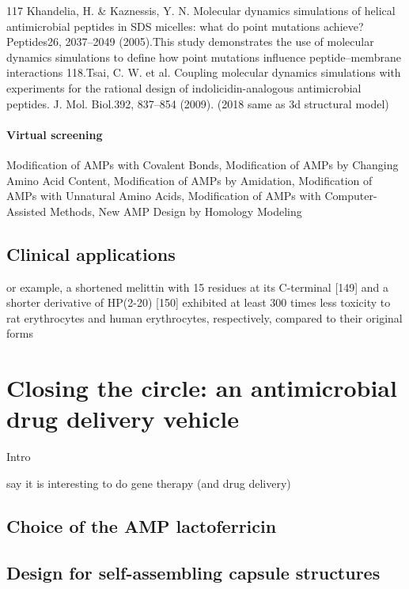 \documentclass[a4paper,11pt]{extreport}
\begin{document}
117 Khandelia, H. & Kaznessis, Y. N. Molecular dynamics simulations of helical antimicrobial peptides in SDS micelles: what do point mutations achieve? Peptides26, 2037–2049 (2005).This study demonstrates the use of molecular dynamics simulations to define how point mutations influence peptide–membrane interactions
118.Tsai, C. W. et al. Coupling molecular dynamics simulations with experiments for the rational design of indolicidin-analogous antimicrobial peptides. J. Mol. Biol.392, 837–854 (2009).
(2018 same as 3d structural model)
\paragraph{Virtual screening}


Modification of AMPs with Covalent Bonds,  Modification of AMPs by Changing Amino Acid Content, Modification of AMPs by Amidation, Modification of AMPs with Unnatural Amino Acids, Modification of AMPs with Computer-Assisted Methods, New AMP Design by Homology Modeling





\subsection{Clinical applications}
or  example,  a  shortened  melittin  with  15  residues  at  its    C-terminal [149] and a shorter derivative of HP(2-20) [150] exhibited at least 300 times less toxicity to rat erythrocytes and human erythrocytes, respectively, compared to their original forms

\section{Closing the circle: an antimicrobial drug delivery vehicle}
Intro

say it is interesting to do gene therapy (and drug delivery)

\subsection{Choice of the AMP lactoferricin}
\subsection{Design for self-assembling capsule structures}
\end{document}
